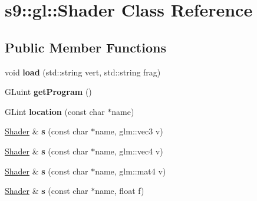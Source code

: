 \hypertarget{classs9_1_1gl_1_1Shader}{\section{s9\-:\-:gl\-:\-:\-Shader \-Class \-Reference}
\label{classs9_1_1gl_1_1Shader}
}
\subsection*{\-Public \-Member \-Functions}
\begin{DoxyCompactItemize}
\item 
\hypertarget{classs9_1_1gl_1_1Shader_a81c5c8efb987cdcd51e0320cc3d805e3}{void {\bfseries load} (std\-::string vert, std\-::string frag)}\label{classs9_1_1gl_1_1Shader_a81c5c8efb987cdcd51e0320cc3d805e3}

\item 
\hypertarget{classs9_1_1gl_1_1Shader_a8ae3cdbcf4c492cba50841534a8135c7}{\-G\-Luint {\bfseries get\-Program} ()}\label{classs9_1_1gl_1_1Shader_a8ae3cdbcf4c492cba50841534a8135c7}

\item 
\hypertarget{classs9_1_1gl_1_1Shader_a9b6dc107bbc1715e937e577e9e11ec11}{\-G\-Lint {\bfseries location} (const char $\ast$name)}\label{classs9_1_1gl_1_1Shader_a9b6dc107bbc1715e937e577e9e11ec11}

\item 
\hypertarget{classs9_1_1gl_1_1Shader_a63ec6fd47885a61249bd498132e2ae7e}{\hyperlink{classs9_1_1gl_1_1Shader}{\-Shader} \& {\bfseries s} (const char $\ast$name, glm\-::vec3 v)}\label{classs9_1_1gl_1_1Shader_a63ec6fd47885a61249bd498132e2ae7e}

\item 
\hypertarget{classs9_1_1gl_1_1Shader_af51d74294db62051f4ca5ee7882fe6ae}{\hyperlink{classs9_1_1gl_1_1Shader}{\-Shader} \& {\bfseries s} (const char $\ast$name, glm\-::vec4 v)}\label{classs9_1_1gl_1_1Shader_af51d74294db62051f4ca5ee7882fe6ae}

\item 
\hypertarget{classs9_1_1gl_1_1Shader_a6e690397a8d663132b15e863b2a39821}{\hyperlink{classs9_1_1gl_1_1Shader}{\-Shader} \& {\bfseries s} (const char $\ast$name, glm\-::mat4 v)}\label{classs9_1_1gl_1_1Shader_a6e690397a8d663132b15e863b2a39821}

\item 
\hypertarget{classs9_1_1gl_1_1Shader_a2728b38fb018d9238697fbf5b3300b8b}{\hyperlink{classs9_1_1gl_1_1Shader}{\-Shader} \& {\bfseries s} (const char $\ast$name, float f)}\label{classs9_1_1gl_1_1Shader_a2728b38fb018d9238697fbf5b3300b8b}


\end{DoxyCompactItemize}
